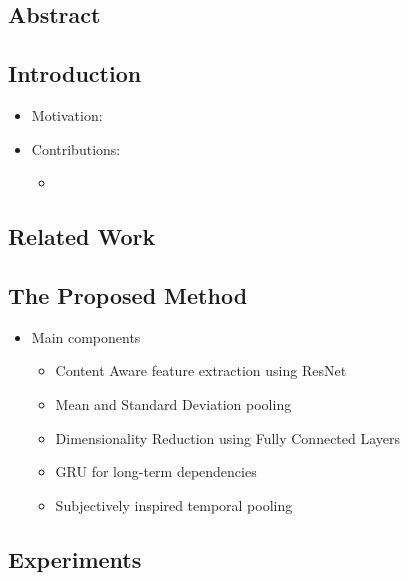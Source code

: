 \documentclass{article}
\begin{document}
    \subsection*{Abstract}

    \subsection{Introduction}\label{subsec:Quality_Assessment_of_In_the_Wild_Videos:introduction}
    \begin{itemize}
        \item Motivation:
        \item Contributions:
        \begin{itemize}
            \item
        \end{itemize}
    \end{itemize}

    \subsection{Related Work}\label{subsec:Quality_Assessment_of_In_the_Wild_Videos:related-work}

    \subsection{The Proposed Method}\label{subsec:Quality_Assessment_of_In_the_Wild_Videos:the-proposed-method}
    \begin{itemize}
        \item Main components
        \begin{itemize}
            \item Content Aware feature extraction using ResNet
            \item Mean and Standard Deviation pooling
            \item Dimensionality Reduction using Fully Connected Layers
            \item GRU for long-term dependencies
            \item Subjectively inspired temporal pooling
        \end{itemize}
    \end{itemize}

    \subsection{Experiments}\label{subsec:Quality_Assessment_of_In_the_Wild_Videos:experiments}
    \newpage
\end{document}
